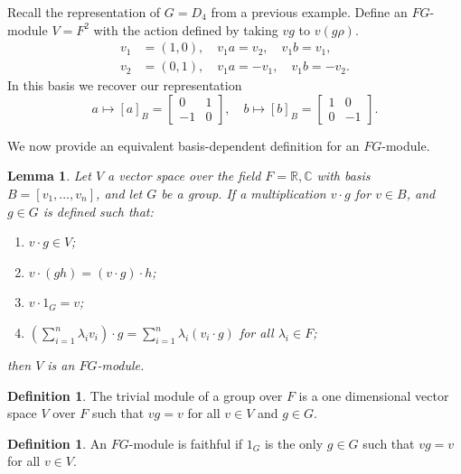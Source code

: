 \documentclass[11pt, notitlepage]{article}
\numberwithin{equation}{section}
\theoremstyle{plain}
\newtheorem{lemma}[theorem]{Lemma}
\theoremstyle{definition}
\newtheorem{definition}[theorem]{Definition}
\newenvironment{example}
	{\pushQED{\qed}\renewcommand{\qedsymbol}{$\blacktriangleleft$}\examplex}
	{\popQED\endexamplex}
\newcommand{\R}{\mathbb{R}}
\newcommand{\C}{\mathbb{C}}
\begin{document}
\begin{example}
	Recall the representation of $G=D_4$ from a previous example. Define an $FG$-module $V=F^2$ with the action defined by taking $vg$ to $v(g\rho)$.
\begin{align*}
	v_1 &= (1,0), \quad v_1 a = v_2, \quad v_1 b = v_1,\\
	v_2 &= (0,1), \quad v_1 a = -v_1, \quad v_1 b = -v_2.
\end{align*}	
In this basis we recover our representation
\[
	a \mapsto [a]_B = \begin{bmatrix} 0 & 1\\ -1 & 0 \end{bmatrix}, \quad
	b \mapsto [b]_B = \begin{bmatrix} 1 & 0\\ 0 & -1 \end{bmatrix}.
\]
\end{example}


We now provide an equivalent basis-dependent definition for an $FG$-module.
\begin{lemma}
	Let $V$ a vector space over the field $F = \R,\C$ with basis $B = [v_1, \ldots, v_n]$, and let $G$ be a group. If a multiplication $v \cdot g$ for $v \in B$, and $g \in G$ is defined such that:
\begin{enumerate}[label=(\roman*)]
    \item $v \cdot g \in V$;
    \item $v \cdot (gh) = (v \cdot g) \cdot h$;
    \item $v \cdot 1_G = v$;
    \item $\left( \sum_{i=1}^n \lambda_i v_i \right) \cdot g = \sum_{i=1}^n \lambda_i (v_i \cdot g)$ for all $\lambda_i \in F$;
\end{enumerate}
then $V$ is an $FG$-module.
\end{lemma}


\begin{definition}
The trivial module of a group over $F$ is a one dimensional vector space $V$ over $F$ such that $v g = v$ for all $v \in V$ and $g \in G$.
\end{definition}

\begin{definition}
An $FG$-module is faithful if $1_G$ is the only $g \in G$ such that $v g = v$ for all $v \in V$.
\end{definition}
\end{document}
